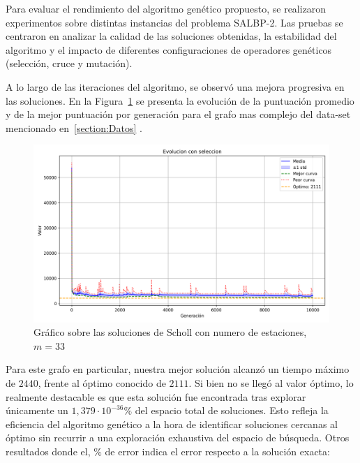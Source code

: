 \documentclass[12pt,a4paper]{report}
\begin{document}
    Para evaluar el rendimiento del algoritmo genético propuesto, se realizaron experimentos sobre distintas instancias del problema SALBP-2. Las pruebas se centraron en analizar la calidad de las soluciones obtenidas, la estabilidad del algoritmo y el impacto de diferentes configuraciones de operadores genéticos (selección, cruce y mutación).

    A lo largo de las iteraciones del algoritmo, se observó una mejora progresiva en las soluciones. En la Figura~\ref{fig:evolucion-punt} se presenta la evolución de la puntuación promedio y de la mejor puntuación por generación para el grafo mas complejo del data-set mencionado en~\ref{section:Datos} .

    \begin{figure}[H]
            \centering
            \includegraphics[width=\linewidth]{DATA/scholl_M33.png}
            \caption{Gráfico sobre las soluciones de Scholl con numero de estaciones, $m=33$}
            \label{fig:evolucion-punt}
    \end{figure}
    Para este grafo en particular, nuestra mejor solución alcanzó un tiempo máximo de $2440$, frente al óptimo conocido de $2111$. Si bien no se llegó al valor óptimo, lo realmente destacable es que esta solución fue encontrada tras explorar únicamente un $1{,}379 \cdot 10^{-36}\%$ del espacio total de soluciones. Esto refleja la eficiencia del algoritmo genético a la hora de identificar soluciones cercanas al óptimo sin recurrir a una exploración exhaustiva del espacio de búsqueda. 
    Otros resultados donde el, $\%$ de error indica el error respecto a la solución exacta:
\end{document}
